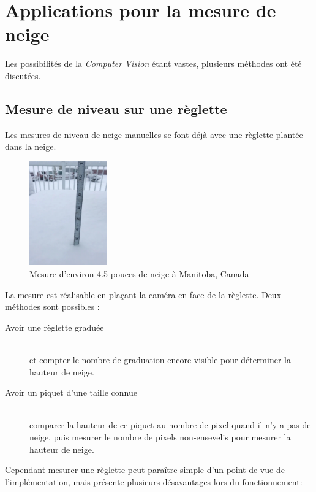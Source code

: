 \section{Applications pour la mesure de neige}
Les possibilités de la \emph{Computer Vision} étant vastes, plusieurs méthodes ont été discutées.

\subsection{Mesure de niveau sur une règlette}
Les mesures de niveau de neige manuelles se font déjà avec une règlette plantée dans la neige.

\begin{figure}[H]
    \centering
    \includegraphics[width=0.3\textwidth]{Images/computer_vision/snow_meter.PNG}
    \caption[Mesure de neige à la règle]{Mesure d'environ 4.5 pouces de neige à Manitoba, Canada\footnotemark[1]}
    \label{fig:Snow meter}
\end{figure}
\noindent
La mesure est réalisable en plaçant la caméra en face de la règlette.
Deux méthodes sont possibles :
\begin{description}
    \item[Avoir une règlette graduée] \hfill \\
    et compter le nombre de graduation encore visible pour déterminer la hauteur de neige.
    \item[Avoir un piquet d'une taille connue] \hfill \\
    comparer la hauteur de ce piquet au nombre de pixel quand il n'y a pas de neige,
    puis mesurer le nombre de pixels non-ensevelis pour mesurer la hauteur de neige.
\end{description}
\noindent
Cependant mesurer une règlette peut paraître simple d'un point de vue de l'implémentation,
mais présente plusieurs désavantages lors du fonctionnement:

